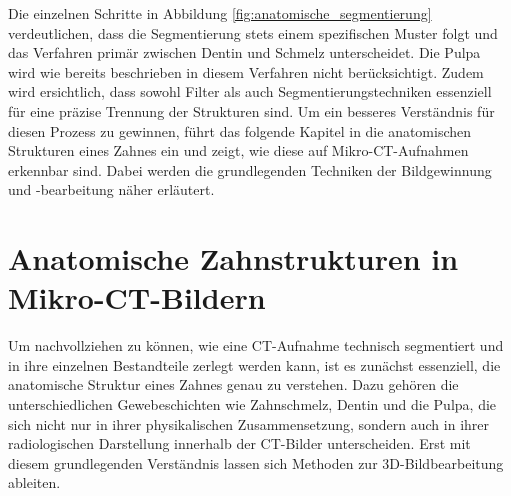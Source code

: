 Die einzelnen Schritte in Abbildung \ref{fig:anatomische_segmentierung}
verdeutlichen, dass die Segmentierung stets einem spezifischen Muster folgt und das
Verfahren primär zwischen Dentin und Schmelz unterscheidet. Die Pulpa wird wie
bereits beschrieben in diesem Verfahren nicht berücksichtigt. Zudem wird ersichtlich,
dass sowohl Filter als auch Segmentierungstechniken essenziell für eine präzise
Trennung der Strukturen sind. Um ein besseres Verständnis für diesen Prozess zu gewinnen,
führt das folgende Kapitel in die anatomischen Strukturen eines Zahnes ein und
zeigt, wie diese auf Mikro-\ac{CT}-Aufnahmen erkennbar sind. Dabei werden die grundlegenden
Techniken der Bildgewinnung und -bearbeitung näher erläutert.

\pagebreak

\section{Anatomische Zahnstrukturen in Mikro-CT-Bildern}
\label{sec:domänenspezifisch} Um nachvollziehen zu können, wie eine \ac{CT}-Aufnahme
technisch segmentiert und in ihre einzelnen Bestandteile zerlegt werden kann,
ist es zunächst essenziell, die anatomische Struktur eines Zahnes genau zu verstehen.
Dazu gehören die unterschiedlichen Gewebeschichten wie Zahnschmelz, Dentin und die
Pulpa, die sich nicht nur in ihrer physikalischen Zusammensetzung, sondern auch in
ihrer radiologischen Darstellung innerhalb der \ac{CT}-Bilder unterscheiden. Erst
mit diesem grundlegenden Verständnis lassen sich Methoden zur \ac{3D}-Bildbearbeitung
ableiten.

